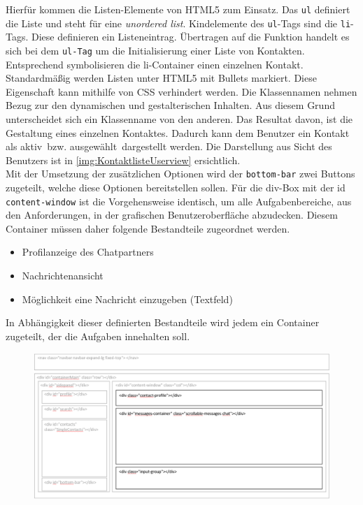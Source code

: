 \documentclass[a4paper,titlepage,halfparskip,12pt]{scrreprt}
\begin{document}
\begin{onehalfspacing}
\begin{figure}[h]
\end{figure}
Hierfür kommen die Listen-Elemente von HTML5 zum Einsatz. Das \texttt{ul} definiert die Liste und steht für eine \textit{unordered list}. Kindelemente des \texttt{ul}-Tags sind die \texttt{li}-Tags. Diese definieren ein Listeneintrag.
Übertragen auf die Funktion handelt es sich bei dem \texttt{ul-Tag} um die Initialisierung einer Liste von Kontakten. Entsprechend symbolisieren die li-Container einen einzelnen Kontakt. Standardmäßig werden Listen unter HTML5 mit Bullets markiert. Diese Eigenschaft kann mithilfe von CSS verhindert werden. Die Klassennamen nehmen Bezug zur den dynamischen und gestalterischen Inhalten. Aus diesem Grund unterscheidet sich ein Klassenname von den anderen. Das Resultat davon, ist die Gestaltung eines einzelnen Kontaktes. Dadurch kann dem Benutzer ein Kontakt als \glqq aktiv\grqq\ bzw. \glqq ausgewählt\grqq\ dargestellt werden. Die Darstellung aus Sicht des Benutzers ist in \autoref{img:KontaktlisteUserview} ersichtlich. \cite{w3schoolsUlTag}\\
Mit der Umsetzung der zusätzlichen Optionen wird der \texttt{bottom-bar} zwei Buttons zugeteilt, welche diese Optionen bereitstellen sollen. Für die div-Box mit der id \texttt{content-window} ist die Vorgehensweise identisch, um alle Aufgabenbereiche, aus den Anforderungen, in der grafischen Benutzeroberfläche abzudecken. Diesem Container müssen daher folgende Bestandteile zugeordnet werden.
\begin{itemize}
	\item Profilanzeige des Chatpartners
	\item Nachrichtenansicht
	\item Möglichkeit eine Nachricht einzugeben (Textfeld)
\end{itemize}
In Abhängigkeit dieser definierten Bestandteile wird jedem ein Container zugeteilt, der die Aufgaben innehalten soll.
\begin{figure}[h]
	\centering
	\includegraphics[scale=0.60]{images/BasisStruktur1GochatContentWindow}

\end{figure}
\end{onehalfspacing}
\end{document}

